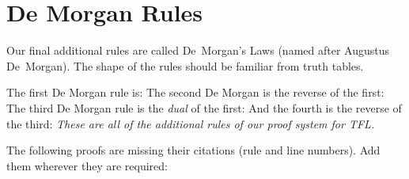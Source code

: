 \section{De Morgan Rules}
Our final additional rules are called De~Morgan's Laws (named after Augustus De~Morgan). The shape of the rules should be familiar from truth tables.

The first De Morgan rule is:
The second De Morgan is the reverse of the first:
The third De Morgan rule is the \emph{dual} of the first:
And the fourth is the reverse of the third:
\emph{These are all of the additional rules of our proof system for TFL.}

\practiceproblems
\solutions
\problempart
\label{pr.justifyTFLproof}
The following proofs are missing their citations (rule and line numbers). Add them wherever they are required:
\begin{compactlist}
\item\begin{fitchproof}
 {}
 {}
\end{fitchproof}
\item\begin{fitchproof}
\open
\close
{}
\end{fitchproof}
\item\begin{fitchproof}
\open
	 {}
		\open
	\close
\close
{}
\end{fitchproof}
\end{compactlist}

